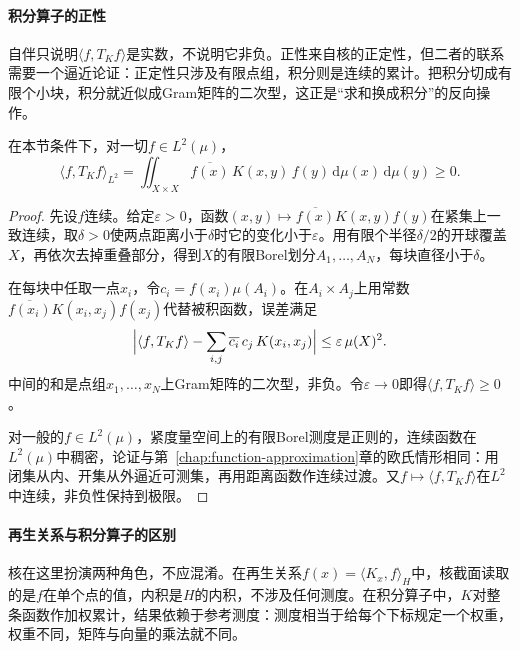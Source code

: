 \paragraph{积分算子的正性}

自伴只说明$\langle f,T_Kf\rangle$是实数，不说明它非负。正性来自核的正定性，但二者的联系需要一个逼近论证：正定性只涉及有限点组，积分则是连续的累计。把积分切成有限个小块，积分就近似成Gram矩阵的二次型，这正是“求和换成积分”的反向操作。

\begin{lemma}[正定连续核给出正算子]
\label{lem:rkhs-positive-operator}
在本节条件下，对一切$f\in L^2(\mu)$，
\begin{equation}
\langle f,T_Kf\rangle_{L^2}=\iint_{X\times X}\overline{f(x)}\,K(x,y)\,f(y)\,\mathrm d\mu(x)\,\mathrm d\mu(y)\geq0 .
\label{eq:rkhs-operator-positivity}
\end{equation}
\end{lemma}

\begin{proof}
先设$f$连续。给定$\varepsilon>0$，函数$(x,y)\mapsto\overline{f(x)}K(x,y)f(y)$在紧集上一致连续，取$\delta>0$使两点距离小于$\delta$时它的变化小于$\varepsilon$。用有限个半径$\delta/2$的开球覆盖$X$，再依次去掉重叠部分，得到$X$的有限Borel划分$A_1,\ldots,A_N$，每块直径小于$\delta$。

在每块中任取一点$x_i$，令$c_i=f(x_i)\mu(A_i)$。在$A_i\times A_j$上用常数$\overline{f(x_i)}K(x_i,x_j)f(x_j)$代替被积函数，误差满足
\[
\Bigl\lvert\langle f,T_Kf\rangle-\sum_{i,j}\overline{c_i}\,c_j\,K(x_i,x_j)\Bigr\rvert\leq\varepsilon\,\mu(X)^2 .
\]
中间的和是点组$x_1,\ldots,x_N$上Gram矩阵的二次型，非负。令$\varepsilon\to0$即得$\langle f,T_Kf\rangle\geq0$。

对一般的$f\in L^2(\mu)$，紧度量空间上的有限Borel测度是正则的，连续函数在$L^2(\mu)$中稠密，论证与第~\ref{chap:function-approximation}章的欧氏情形相同：用闭集从内、开集从外逼近可测集，再用距离函数作连续过渡。又$f\mapsto\langle f,T_Kf\rangle$在$L^2$中连续，非负性保持到极限。
\end{proof}

\paragraph{再生关系与积分算子的区别}

核在这里扮演两种角色，不应混淆。在再生关系$f(x)=\langle K_x,f\rangle_H$中，核截面读取的是$f$在单个点的值，内积是$H$的内积，不涉及任何测度。在积分算子中，$K$对整条函数作加权累计，结果依赖于参考测度：测度相当于给每个下标规定一个权重，权重不同，矩阵与向量的乘法就不同。

